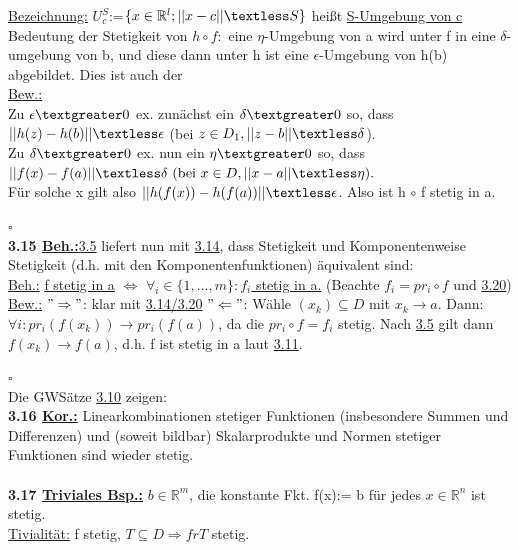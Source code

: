 \documentclass[]{scrartcl}
\begin{document}
	\underline{Bezeichnung:}  
	\ul{$U^S_c$}:=\ul{$\{x\in \mathbb{R}^l; ||x-c||\textless 
	S\}$} heißt \ul{S-Umgebung von c} Bedeutung der Stetigkeit von $h\circ f:$ 
	eine $\eta$-Umgebung von a wird unter f in eine $\delta$-umgebung von b, 
	und diese dann unter h ist eine $\epsilon$-Umgebung von h(b) abgebildet. 
	Dies ist auch der\\
	\underline{Bew.:}\\
	Zu $\epsilon\textgreater 0$ ex. zunächst ein $\delta \textgreater 0$ so, 
	dass $||h(z)-h(b)|| \textless \epsilon$ (bei $z \in D_1, ||z-b|| \textless 
	\delta$).\\
	Zu $\delta\textgreater 0$ ex. nun ein $\eta \textgreater 0$ so, dass 
	$||f(x)-f(a)||\textless \delta\ (\text{bei } x\in D ,|| x-a||\textless 
	\eta).$\\
	Für solche x gilt also $||h(f(x))-h(f(a))||\textless \epsilon$. Also ist h 
	$\circ$ f stetig in a.\\
	\strut\hfill$\square$\\
	\textbf{3.15 \underline{Beh.:}}\ul{3.5} liefert nun mit  
	\ul{3.14}, dass Stetigkeit und Komponentenweise Stetigkeit (d.h. mit den 
	Komponentenfunktionen) äquivalent sind:\\
	\underline{Beh.:} \ul{f stetig in a} $\Leftrightarrow$ 
	\ul{$\forall_i \in \{1,...,m\}:f_i$ stetig in a.} (Beachte $f_i=pr_i\circ 
	f$ und \ul{3.20})\\
	\underline{Bew.:} $"\Rightarrow"$: klar mit \ul{3.14/3.20} $"\Leftarrow"$: 
	Wähle $(x_k) \subseteq D$ mit $x_k\rightarrow a.$ Dann:\\
	$\forall i: pr_i(f(x_k))\rightarrow pr_i(f(a))$, da die $pr_i\circ f=f_i$ 
	stetig. Nach \ul{3.5} gilt dann $f(x_k)\rightarrow f(a)$, d.h. f ist stetig 
	in a laut \ul{3.11}.\\
	\strut\hfill$\square$\\
	Die GWSätze \ul{3.10} zeigen:\\
	\textbf{3.16 \underline{Kor.:}} Linearkombinationen stetiger Funktionen 
	(insbesondere Summen und Differenzen) und (soweit bildbar) Skalarprodukte 
	und Normen stetiger Funktionen sind wieder stetig.\\
	\\
	\textbf{3.17 \underline{Triviales Bsp.:}} $b\in\mathbb{R}^m$, die konstante 
	Fkt. f(x):= b für jedes $x\in\mathbb{R}^n$ ist stetig.\\
	\underline{Tivialität:} f stetig, $T\subseteq D\Rightarrow f r T$ stetig.\\
\end{document}
